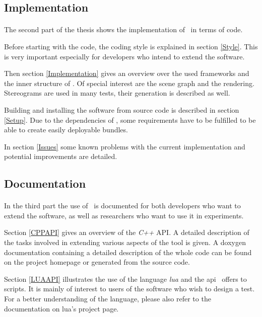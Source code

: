 \subsection{Implementation}
\paragraph{}
The second part of the thesis shows the implementation of \ER\ in terms of code.

Before starting with the code, the coding style is explained in section \ref{Style}.
This is very important especially for developers who intend to extend the software.

Then section \ref{Implementation} gives an overview over the used frameworks and the inner structure of \ER.
Of special interest are the scene graph and the rendering.
Stereograms are used in many tests, their generation is described as well.

Building and installing the software from source code is described in section \ref{Setup}.
Due to the dependencies of \ER, some requirements have to be fulfilled to be able to create easily deployable bundles.

In section \ref{Issues} some known problems with the current implementation and potential improvements are detailed.


\subsection{Documentation}
\paragraph{}
In the third part the use of \ER\ is documented for both developers who want to extend the software, as well as researchers who want to use it in experiments.

Section \ref{CPPAPI} gives an overview of the \textit{C++} API.
A detailed description of the tasks involved in extending various aspects of the tool is given.
A doxygen documentation containing a detailed description of the whole code can be found on the project homepage\cite{project} or generated from the source code.

Section \ref{LUAAPI} illustrates the use of the language \textit{lua} and the api \ER\ offers to scripts.
It is mainly of interest to users of the software who wish to design a test.
For a better understanding of the language, please also refer to the documentation on lua's project page\cite{lua}.

